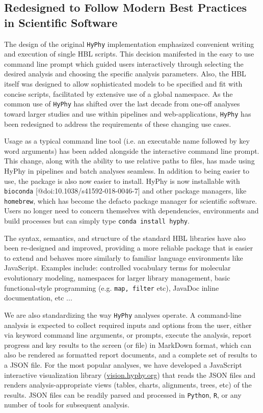 \documentclass[nogrid]{MBE}%
\newcommand{\sw}[1]{{\tt #1}}
\newcommand{\hyphy}{{\tt HyPhy}}
\begin{document}
\subsection{Redesigned to Follow Modern Best Practices in Scientific Software  }

The design of the original \hyphy{} implementation emphasized convenient writing
and execution of single HBL scripts.  This decision manifested in the easy to
use command line prompt which guided users interactively through selecting the
desired analysis and choosing the specific analysis parameters.  Also, the HBL
itself was designed to allow sophisticated models to be specified and fit with
concise scripts, facilitated by extensive use of a global namespace.  As the
common use of \hyphy{} has shifted over the last decade from one-off analyses
toward larger studies and use within pipelines and web-applications, \hyphy{}
has  been redesigned to address the requirements of these changing use cases.   

Usage as a typical command line tool (i.e. an executable name followed by key
word arguments) has been added alongside the interactive command line prompt.
This change, along with the ability to use relative paths to files, has made
using HyPhy in pipelines and batch analyses seamless. In addition to being
easier to use, the package is also now easier to install. HyPhy is now
installable with \sw{bioconda} [@doi:10.1038/s41592-018-0046-7] and other
package managers, like \sw{homebrew}, which has become the defacto package
manager for scientific software. Users no longer need to concern themselves with
dependencies, environments and build processes but can simply type \sw{conda
install hyphy}.

The syntax, semantics, and structure of the standard HBL libraries have also
been re-designed and improved, providing a more reliable package that is easier
to extend and behaves more similarly to familiar language environments like
JavaScript.  Examples include: controlled vocabulary terms for molecular
evolutionary modeling, namespaces for larger library management, basic
functional-style programming (e.g. \sw{map, filter} etc), JavaDoc inline
documentation, etc ...

We are also standardizing the way \hyphy{} analyses operate. A command-line
analysis is expected to collect required inputs and options from the user,
either via keyword command line arguments, or prompts, execute the analysis,
report progress and key results to the screen (or file) in MarkDown format,
which can also be rendered as formatted report documents, and a complete set of
results to a JSON file. For the most popular analyses, we have developed a
JavaScript interactive visualization library (\url{vision.hyphy.org}) that reads
the JSON files and renders analysis-appropriate views (tables, charts,
alignments, trees, etc) of the results. JSON files can be readily parsed and
processed in \sw{Python}, \sw{R}, or any number of tools for subsequent
analysis. 
\end{document}
